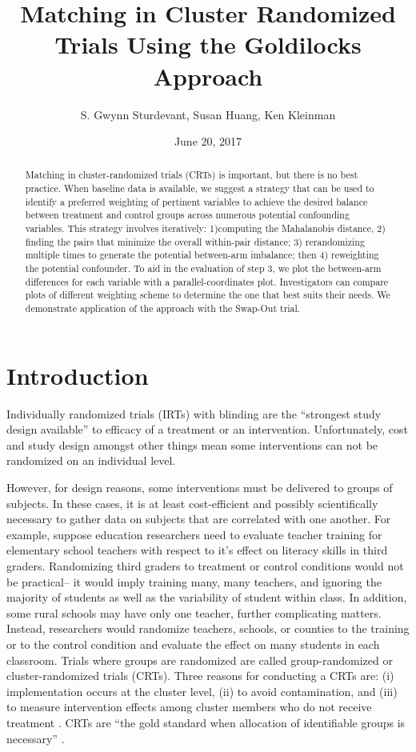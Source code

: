 \documentclass[]{article}
\title{Matching in Cluster Randomized Trials Using the Goldilocks Approach}
\author{S. Gwynn Sturdevant, Susan Huang, Ken Kleinman}
\date{June 20, 2017}
\begin{document}
\maketitle
\begin{abstract}
Matching in cluster-randomized trials (CRTs) is important, but there is
no best practice. When baseline data is available, we suggest a strategy
that can be used to identify a preferred weighting of pertinent
variables to achieve the desired balance between treatment and control
groups across numerous potential confounding variables. This strategy
involves iteratively: 1)computing the Mahalanobis distance, 2) finding
the pairs that minimize the overall within-pair distance; 3)
rerandomizing multiple times to generate the potential between-arm
imbalance; then 4) reweighting the potential confounder. To aid in the
evaluation of step 3, we plot the between-arm differences for each
variable with a parallel-coordinates plot. Investigators can compare
plots of different weighting scheme to determine the one that best suits
their needs. We demonstrate application of the approach with the
Swap-Out trial.
\end{abstract}

\section{Introduction}\label{introduction}

Individually randomized trials (IRTs) with blinding are the ``strongest
study design available'' \citep{gatsonis2017methods} to efficacy of a
treatment or an intervention. Unfortunately, cost and study design
amongst other things mean some interventions can not be randomized on an
individual level.

However, for design reasons, some interventions must be delivered to
groups of subjects. In these cases, it is at least cost-efficient and
possibly scientifically necessary to gather data on subjects that are
correlated with one another. For example, suppose education researchers
need to evaluate teacher training for elementary school teachers with
respect to it's effect on literacy skills in third graders. Randomizing
third graders to treatment or control conditions would not be
practical-- it would imply training many, many teachers, and ignoring
the majority of students as well as the variability of student within
class. In addition, some rural schools may have only one teacher,
further complicating matters. Instead, researchers would randomize
teachers, schools, or counties to the training or to the control
condition and evaluate the effect on many students in each classroom.
Trials where groups are randomized are called group-randomized or
cluster-randomized trials (CRTs). Three reasons for conducting a CRTs
are: (i) implementation occurs at the cluster level, (ii) to avoid
contamination, and (iii) to measure intervention effects among cluster
members who do not receive treatment
\citep{balzer2012match, CRTrials2009}. CRTs are ``the gold standard when
allocation of identifiable groups is necessary''
\citep{murray2004design}.
\end{document}
